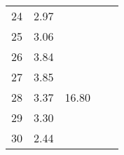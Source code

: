 \begin{center}
\begin{tabular}{| l || c | c | c | c |}
24 & \multirow{1}{*}{ 2.97 }  & & & \\\cline{2-2}
25 & \multirow{1}{*}{ 3.06 }  & & & \\\cline{2-2}\cline{3-3}
26 & \multirow{1}{*}{ 3.84 }  & \multirow{5}{*}{ 16.80 }  & & \\\cline{2-2}
27 & \multirow{1}{*}{ 3.85 }  & & & \\\cline{2-2}
28 & \multirow{1}{*}{ 3.37 }  & & & \\\cline{2-2}
29 & \multirow{1}{*}{ 3.30 }  & & & \\\cline{2-2}
30 & \multirow{1}{*}{ 2.44 }  & & & \\\cline{2-2}\cline{3-3}\cline{4-4}\cline{5-5}
\hline\end{tabular}
\end{center}